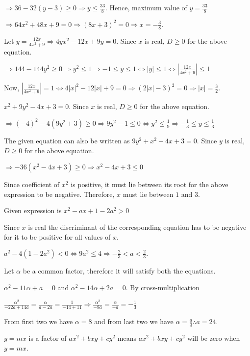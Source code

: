  $\Rightarrow 36 - 32(y - 3) \ge 0\Rightarrow y \le \frac{33}{8}$. Hence, maximum value of $y = \frac{33}{8}$

  $\Rightarrow 64x^2 + 48x + 9 = 0\Rightarrow (8x + 3)^2 = 0 \Rightarrow x = -\frac{3}{8}$.
\item Let $y = \frac{12x}{4x^2 + 9}\Rightarrow 4yx^2 - 12x + 9y = 0$. Since $x$ is real, $D \ge 0$ for the
  above equation.

  $\Rightarrow 144 - 144y^2 \ge 0\Rightarrow y^2 \le 1\Rightarrow -1 \le y \le 1 \Leftrightarrow |y| \le 1
  \Leftrightarrow\left|\frac{12x}{4x^2 + 9}\right| \le 1$

  Now, $\left|\frac{12x}{4x^2 + 9}\right| = 1 \Leftrightarrow 4|x|^2 - 12|x| + 9 = 0\Rightarrow (2|x| - 3)^2
  = 0 \Rightarrow |x| = \frac{3}{2}$.
\item $x^2 + 9y^2 - 4x + 3 = 0$. Since $x$ is real, $D \ge 0$ for the above equation.

  $\Rightarrow (-4)^2 - 4(9y^2 + 3) \ge 0\Rightarrow 9y^2 - 1 \le 0 \Leftrightarrow y^2 \le
  \frac{1}{9}\Rightarrow -\frac{1}{3} \le y \le \frac{1}{3}$

  The given equation can also be written as $9y^2 + x^2 - 4x + 3 = 0$. Since $y$ is real, $D \ge 0$ for the
  above equation.

  $\Rightarrow -36(x^2 - 4x + 3) \ge 0\Rightarrow x^2 - 4x + 3 \le 0$

  Since coefficient of $x^2$ is positive, it must lie between its root for the above expression to be negative.
  Therefore, $x$ must lie between $1$ and $3$.
\item Given expression is $x^2 - ax + 1 - 2a^2 > 0$

  Since $x$ is real the discriminant of the corresponding equation has to be negative for it to be positive
  for all values of $x$.

  $a^2 - 4(1 - 2a^2) < 0 \Leftrightarrow 9a^2 \le 4\Rightarrow -\frac{2}{3} < a < \frac{2}{3}$.
\item Let $\alpha$ be a common factor, therefore it will satisfy both the equations.

  $\alpha^2 - 11\alpha + a = 0$ and $\alpha^2 - 14\alpha + 2a = 0$. By cross-multiplication

  $\frac{\alpha^2}{-22a + 14a} = \frac{\alpha}{a - 2a} = \frac{1}{-14 + 11}\Rightarrow \frac{\alpha^2}{-8a}
  = \frac{\alpha}{-a} = -\frac{1}{3}$

  From first two we have $\alpha = 8$ and from last two we have $\alpha = \frac{a}{3}\therefore a = 24$.
\item $y = mx$ is a factor of $ax^2 + bxy + cy^2$ means $ax^2 + bxy + cy^2$ will be zero when
  $y = mx$.

